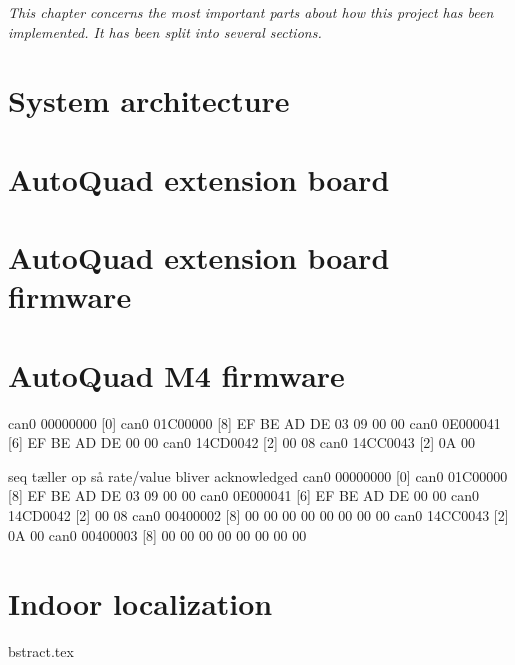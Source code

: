 \textit{This chapter concerns the most important parts about how this project has been implemented. It has been split into several sections.}

\newpage
\section{System architecture}

\newpage

\section{AutoQuad extension board}

\newpage

\section{AutoQuad extension board firmware}


\newpage
\section{AutoQuad M4 firmware}


\newpage




  can0  00000000   [0] 
  can0  01C00000   [8]  EF BE AD DE 03 09 00 00
  can0  0E000041   [6]  EF BE AD DE 00 00
  can0  14CD0042   [2]  00 08
  can0  14CC0043   [2]  0A 00



seq tæller op så rate/value bliver acknowledged
  can0  00000000   [0] 
  can0  01C00000   [8]  EF BE AD DE 03 09 00 00
  can0  0E000041   [6]  EF BE AD DE 00 00
  can0  14CD0042   [2]  00 08
  can0  00400002   [8]  00 00 00 00 00 00 00 00
  can0  14CC0043   [2]  0A 00
  can0  00400003   [8]  00 00 00 00 00 00 00 00



\section{Indoor localization}

bstract.tex
